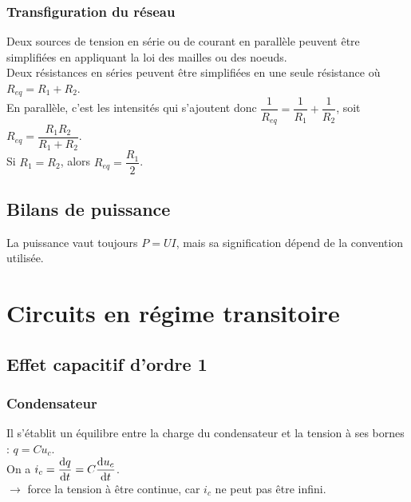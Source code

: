 \documentclass[13pt, twoside, a4paper, french]{report}
\begin{document}
    \subsection{Transfiguration du réseau}\label{subsec:transfiguration-du-reseau}

    Deux sources de tension en série ou de courant en parallèle peuvent être simplifiées en appliquant la loi des mailles ou des noeuds.\\

    Deux résistances en séries peuvent être simplifiées en une seule résistance où $R_{eq} = R_1 + R_2$.\\
    En parallèle, c'est les intensités qui s'ajoutent donc $\dfrac{1}{R_{eq}} = \dfrac{1}{R_1} + \dfrac{1}{R_2}$, soit $R_{eq} = \dfrac{R_1 R_2}{R_1 + R_2}$.\\
    Si $R_1 = R_2$, alors $R_{eq} = \dfrac{R_1}{2}$.\\


    \section{Bilans de puissance}\label{sec:bilans-de-puissance}

    La puissance vaut toujours $P = UI$, mais sa signification dépend de la convention utilisée.


    \chapter{Circuits en régime transitoire}\label{ch:circuits-en-regime-transitoire}


    \section{Effet capacitif d'ordre 1}\label{sec:effet-capacitif-d'ordre-1}

    \subsection{Condensateur}\label{subsec:condensateur}

    Il s'établit un équilibre entre la charge du condensateur et la tension à ses bornes : $q = C u_c$.\\

    On a $i_c = \dfrac{\textrm d q}{\textrm d t} = C \dfrac{\textrm d u_c}{\textrm d t}$.\\
    $\rightarrow$ force la tension à être continue, car $i_c$ ne peut pas être infini.\\
\end{document}
